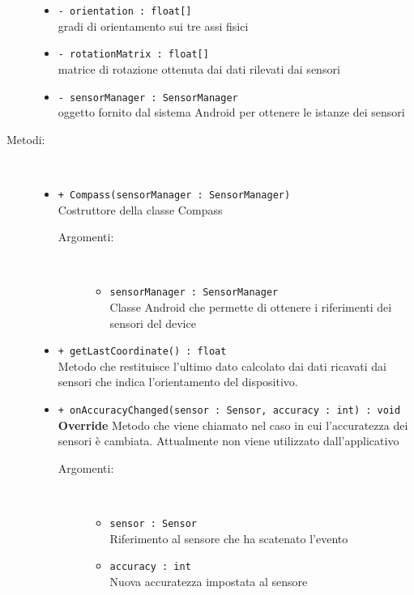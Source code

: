 \documentclass[../DefinizioneDiProdotto.tex]{subfiles}
\begin{document}
\begin{description}
\begin{itemize}
		\item \texttt{- orientation : float[]}\\
		gradi di orientamento sui tre assi fisici
		
		\item \texttt{- rotationMatrix : float[]}\\
		matrice di rotazione ottenuta dai dati rilevati dai sensori
		
		\item \texttt{- sensorManager : SensorManager}\\
		oggetto fornito dal sistema Android per ottenere le istanze dei sensori
		
	\end{itemize}
	\item[Metodi:] \
	\begin{itemize}
		\item \texttt{+ Compass(sensorManager : SensorManager)}\\
		Costruttore della classe Compass
		\begin{description}
			\item[Argomenti:] \
			\begin{itemize}
				\item \texttt{sensorManager : SensorManager}\\
				Classe Android che permette di ottenere i riferimenti dei sensori del device\end{itemize}
		\end{description}
		\item \texttt{+ getLastCoordinate() : float}\\
		Metodo che restituisce l'ultimo dato calcolato dai dati ricavati dai sensori che indica l'orientamento del dispositivo.
		\item \texttt{+ onAccuracyChanged(sensor : Sensor, accuracy : int) : void}\\
		\textbf{Override} Metodo che viene chiamato nel caso in cui l'accuratezza dei sensori è cambiata. Attualmente non viene utilizzato dall'applicativo
		\begin{description}
			\item[Argomenti:] \
			\begin{itemize}
				\item \texttt{sensor : Sensor}\\
				Riferimento al sensore che ha scatenato l'evento\item \texttt{accuracy : int}\\
				Nuova accuratezza impostata al sensore \end{itemize}

\end{description}
\end{itemize}
\end{description}
\end{document}
